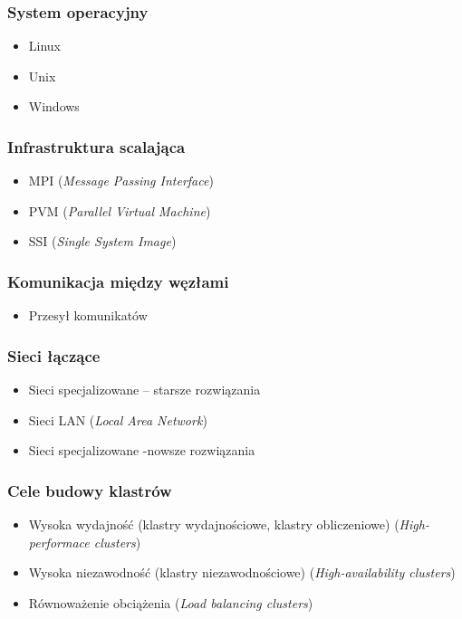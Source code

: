 		\subsubsection{System operacyjny}
			\begin{itemize}
				\item Linux
				\item Unix
				\item Windows
			\end{itemize}
		\subsubsection{Infrastruktura scalająca}
			\begin{itemize}
				\item MPI (\emph{Message Passing Interface})
				\item PVM (\emph{Parallel Virtual Machine})
				\item SSI (\emph{Single System Image})
			\end{itemize}
		\subsubsection{Komunikacja między węzłami}
			\begin{itemize}
				\item Przesył komunikatów
			\end{itemize}
		\subsubsection{Sieci łączące}
			\begin{itemize}
				\item Sieci specjalizowane – starsze rozwiązania
				\item Sieci LAN (\emph{Local Area Network})
				\item Sieci specjalizowane -nowsze rozwiązania
			\end{itemize}
		\subsubsection{Cele budowy klastrów}
			\begin{itemize}
				\item Wysoka wydajność (klastry wydajnościowe, klastry obliczeniowe) (\emph{High-performace clusters})
				\item Wysoka niezawodność (klastry niezawodnościowe) (\emph{High-availability clusters})
				\item Równoważenie obciążenia (\emph{Load balancing clusters})
			\end{itemize}
